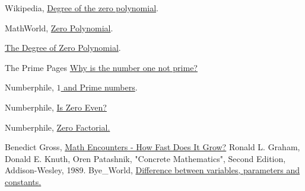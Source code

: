 \documentclass[11pt]{article}
\theoremstyle{definition}
\begin{document}
\begin{thebibliography}{99} %

 Wikipedia, \href{https://en.wikipedia.org/wiki/Degree_of_a_polynomial#Degree_of_the_zero_polynomial} {Degree of the zero polynomial}.

 MathWorld, \href{http://mathworld.wolfram.com/ZeroPolynomial.html}{Zero Polynomial}.

 \href{http://math.stackexchange.com/questions/495378/the-degree-of-zero-polynomial}{The Degree of Zero Polynomial}.

 The Prime Pages \href{https://primes.utm.edu/notes/faq/one.html}{Why is the number one not prime?}


 Numberphile, \href{https://www.youtube.com/watch?v=IQofiPqhJ_s}{$1$ and Prime numbers}.

 Numberphile, \href{https://www.youtube.com/watch?v=8t1TC-5OLdM}{Is Zero Even?}

 Numberphile, \href{https://www.youtube.com/watch?v=Mfk_L4Nx2ZI}{Zero Factorial.}

 Benedict Gross, \href{https://www.youtube.com/watch?v=vI0Q2K2dDYc}{Math Encounters - How Fast Does It Grow?}
 Ronald L. Graham, Donald E. Knuth, Oren Patashnik, "Concrete Mathematics", Second Edition,  Addison-Wesley, 1989.
 Bye\_World, \href{https://math.stackexchange.com/questions/1290373/difference-between-variables-parameters-and-constants/1290405#1290405}{Difference between variables, parameters and constants.}
\end{thebibliography}
\end{document}
